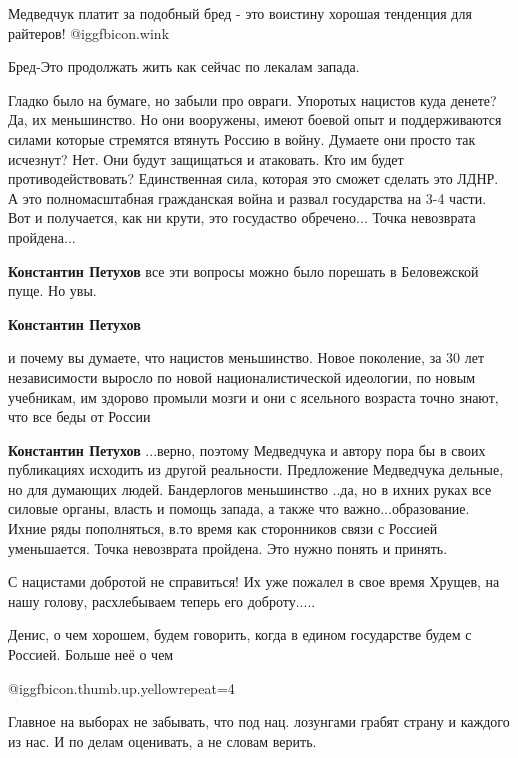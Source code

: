 \begin{itemize}
Медведчук платит за подобный бред - это воистину хорошая тенденция для райтеров!  @igg{fbicon.wink} 

Бред-Это продолжать жить как сейчас по лекалам запада.


Гладко было на бумаге, но забыли про овраги. Упоротых нацистов куда денете? Да,
их меньшинство. Но они вооружены, имеют боевой опыт и поддерживаются силами
которые стремятся втянуть Россию в войну. Думаете они просто так исчезнут? Нет.
Они будут защищаться и атаковать. Кто им будет противодействовать? Единственная
сила, которая это сможет сделать это ЛДНР. А это полномасштабная гражданская
война и развал государства на 3-4 части. Вот и получается, как ни крути, это
госудаство обречено... Точка невозврата пройдена...

\begin{itemize} %
\textbf{Константин Петухов} все эти вопросы можно было порешать в Беловежской пуще. Но увы.

\textbf{Константин Петухов} 

и почему вы думаете, что нацистов меньшинство. Новое поколение, за 30 лет
независимости выросло по новой националистической идеологии, по новым
учебникам, им здорово промыли мозги и они с ясельного возраста точно знают, что
все беды от России

\textbf{Константин Петухов} ...верно, поэтому Медведчука и автору пора бы в своих публикациях исходить из другой реальности.
Предложение Медведчука дельные, но для думающих людей.
Бандерлогов меньшинство ..да, но в ихних руках все силовые органы, власть и помощь запада, а также что важно...образование.
Ихние ряды пополняться, в.то время как сторонников связи с Россией уменьшается.
Точка невозврата пройдена.
Это нужно понять и принять.

\end{itemize} %

С нацистами добротой не справиться! Их уже пожалел в свое время Хрущев, на нашу голову, расхлебываем теперь его доброту.....

Денис, о чем хорошем, будем говорить, когда в едином государстве будем с Россией. Больше неё о чем

 @igg{fbicon.thumb.up.yellow}{repeat=4} 

Главное на выборах не забывать, что под нац. лозунгами грабят страну и каждого из нас. И по делам оценивать, а не словам верить.


\end{itemize}
